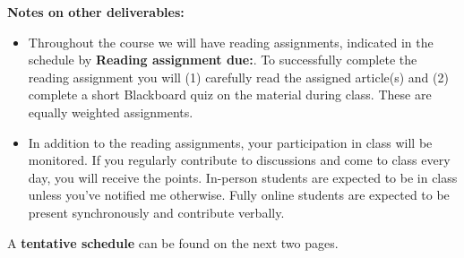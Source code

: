 \documentclass[11pt]{article}\usepackage[]{graphicx}\usepackage[]{color}
\begin{document}
\textbf {\large Notes on other deliverables:} 
{\small
\noindent
\begin{itemize}
\item Throughout the course we will have reading assignments, indicated in the schedule by \textbf{Reading assignment due:}. To successfully complete the reading assignment you will (1) carefully read the assigned article(s) and (2) complete a short Blackboard quiz on the material during class. These are equally weighted assignments.

\item In addition to the reading assignments, your participation in class will be monitored. If you regularly contribute to discussions and come to class every day, you will receive the points. In-person students are expected to be in class unless you've notified me otherwise. Fully online students are expected to be present synchronously and contribute verbally.

\end{itemize}
\vspace{.5cm}

A \textbf{tentative schedule} can be found on the next two pages. 

}
\end{document}
